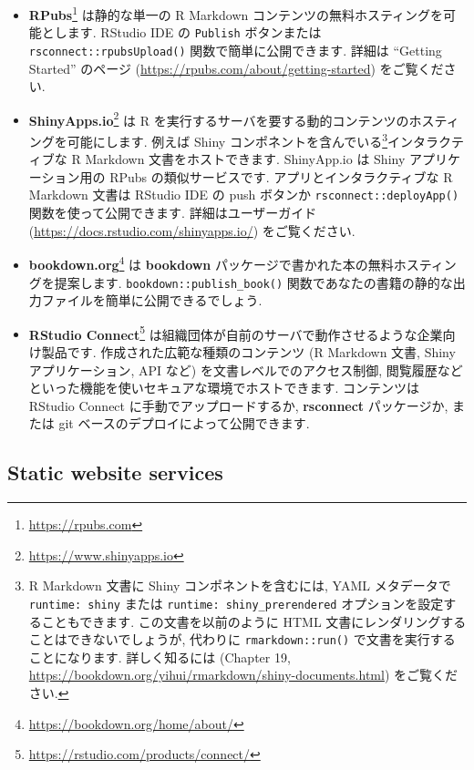 \documentclass[
  11pt,
  lualatex,ja=standard,jafont=noto]{bxjsreport}
\renewcommand{\href}[2]{#2\footnote{\url{#1}}}
\begin{document}
\begin{itemize}
\item
  \href{https://rpubs.com}{\textbf{RPubs}} は静的な単一の R Markdown コンテンツの無料ホスティングを可能とします. RStudio IDE の \texttt{Publish} ボタンまたは \texttt{rsconnect::rpubsUpload()} 関数で簡単に公開できます. 詳細は ``Getting Started'' のページ (\url{https://rpubs.com/about/getting-started}) をご覧ください.
\item
  \href{https://www.shinyapps.io}{\textbf{ShinyApps.io}} は R を実行するサーバを要する動的コンテンツのホスティングを可能にします. 例えば Shiny コンポネントを含んでいる\footnote{R Markdown 文書に Shiny コンポネントを含むには, YAML メタデータで \texttt{runtime: shiny} または \texttt{runtime: shiny\_prerendered} オプションを設定することもできます. この文書を以前のように HTML 文書にレンダリングすることはできないでしょうが, 代わりに \texttt{rmarkdown::run()} で文書を実行することになります. 詳しく知るには \textcite{rmarkdown2018} (Chapter 19, \url{https://bookdown.org/yihui/rmarkdown/shiny-documents.html}) をご覧ください.}インタラクティブな R Markdown 文書をホストできます. ShinyApp.io は Shiny アプリケーション用の RPubs の類似サービスです. アプリとインタラクティブな R Markdown 文書は RStudio IDE の push ボタンか \texttt{rsconnect::deployApp()} 関数を使って公開できます. 詳細はユーザーガイド (\url{https://docs.rstudio.com/shinyapps.io/}) をご覧ください.
\item
  \href{https://bookdown.org/home/about/}{\textbf{bookdown.org}} は \textbf{bookdown} パッケージで書かれた本の無料ホスティングを提案します. \texttt{bookdown::publish\_book()} 関数であなたの書籍の静的な出力ファイルを簡単に公開できるでしょう.
\item
  \href{https://rstudio.com/products/connect/}{\textbf{RStudio Connect}} は組織団体が自前のサーバで動作させるような企業向け製品です. 作成された広範な種類のコンテンツ (R Markdown 文書, Shiny アプリケーション, API など) を文書レベルでのアクセス制御, 閲覧履歴などといった機能を使いセキュアな環境でホストできます. コンテンツは RStudio Connect に手動でアップロードするか, \textbf{rsconnect} パッケージか, または git ベースのデプロイによって公開できます.
\end{itemize}

\hypertarget{static-website-services}{%
\subsection{Static website services}\label{static-website-services}}
\end{document}
